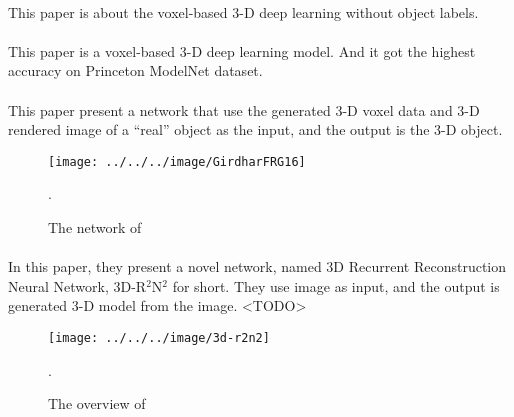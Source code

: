 \documentclass[border=0.5in]{blog}
\begin{document}
    \paragraph{\citep{DBLP:journals/corr/SharmaGF16}}
    
    This paper is about the voxel-based 3-D deep learning without object labels.
    
    \paragraph{\citep{DBLP:journals/corr/BrockLRW16}}
    
    This paper is a voxel-based 3-D deep learning model.
    And it got the highest accuracy on Princeton ModelNet dataset.
    
    \paragraph{\citep{DBLP:journals/corr/GirdharFRG16}}
    
    This paper present a network that use the generated 3-D voxel data
    and 3-D rendered image of a ``real'' object as the input, and the output
    is the 3-D object.
    
    \begin{figure}
        \centering
        \texttt{[image: ../../../image/GirdharFRG16]}
        \caption{The network of \citep{DBLP:journals/corr/GirdharFRG16}}.
        \label{fig:GirdharFRG16}
    \end{figure}


    \paragraph{\citep{DBLP:journals/corr/ChoyXGCS16}}
    In this paper, they present a novel network,
    named 3D Recurrent Reconstruction Neural Network, 3D-R$^2$N$^2$ for short.
    They use image as input, and the output is generated 3-D model from the image.
    <TODO>

    \begin{figure}
        \centering
        \texttt{[image: ../../../image/3d-r2n2]}
        \caption{The overview of \citep{DBLP:journals/corr/ChoyXGCS16}}.
        \label{fig:3d-r2n2}
    \end{figure}
    
    \paragraph{\citep{DBLP:journals/corr/MilletariNA16}}
    
\end{document}
